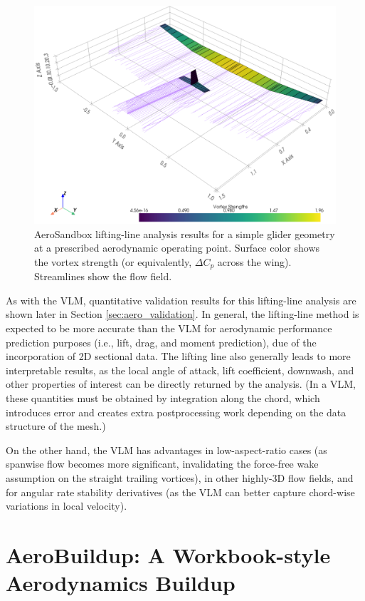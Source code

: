 \begin{figure}[h]
    \centering
    \includegraphics[width=\textwidth]{../figures/ll.png}
    \caption{AeroSandbox lifting-line analysis results for a simple glider geometry at a prescribed aerodynamic operating point. Surface color shows the vortex strength (or equivalently, $\Delta C_p$ across the wing). Streamlines show the flow field.}
    \label{fig:ll}
\end{figure}

As with the VLM, quantitative validation results for this lifting-line analysis are shown later in Section \ref{sec:aero_validation}. In general, the lifting-line method is expected to be more accurate than the VLM for aerodynamic performance prediction purposes (i.e., lift, drag, and moment prediction), due of the incorporation of 2D sectional data. The lifting line also generally leads to more interpretable results, as the local angle of attack, lift coefficient, downwash, and other properties of interest can be directly returned by the analysis. (In a VLM, these quantities must be obtained by integration along the chord, which introduces error and creates extra postprocessing work depending on the data structure of the mesh.)

On the other hand, the VLM has advantages in low-aspect-ratio cases (as spanwise flow becomes more significant, invalidating the force-free wake assumption on the straight trailing vortices), in other highly-3D flow fields, and for angular rate stability derivatives (as the VLM can better capture chord-wise variations in local velocity).


\section{AeroBuildup: A Workbook-style Aerodynamics Buildup}
\label{sec:aerobuildup}

